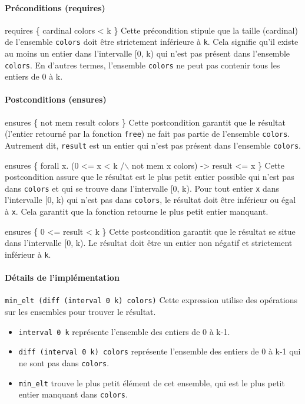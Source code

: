 \documentclass[11pt]{article}
\begin{document}
\paragraph{Préconditions (requires)}
\label{sec:org3ab6fb4}

requires \{ cardinal colors < k \}
  Cette précondition stipule que la taille (cardinal) 
de l'ensemble \texttt{colors} doit être strictement inférieure à \texttt{k}.
 Cela signifie qu'il existe au moins un entier dans l'intervalle [0, k) qui n'est pas présent dans l'ensemble \texttt{colors}. 
En d'autres termes, l'ensemble \texttt{colors} ne peut pas contenir tous les entiers de 0 à k.

\paragraph{Postconditions (ensures)}
\label{sec:orgfbcf911}

ensures \{ not mem result colors \}
  Cette postcondition garantit que le résultat (l'entier retourné par la fonction \texttt{free}) ne fait pas partie de l'ensemble \texttt{colors}. 
Autrement dit, \texttt{result} est un entier qui n'est pas présent dans l'ensemble \texttt{colors}.

ensures \{ forall x. (0 <= x < k /$\backslash$ not mem x colors) -> result <= x \}
  Cette postcondition assure que le résultat est le plus petit entier possible qui n'est pas dans \texttt{colors} et qui se trouve dans l'intervalle [0, k). 
Pour tout entier \texttt{x} dans l'intervalle [0, k) qui n'est pas dans \texttt{colors}, le résultat doit être inférieur ou égal à \texttt{x}. 
Cela garantit que la fonction retourne le plus petit entier manquant.

ensures \{ 0 <= result < k \}
  Cette postcondition garantit que le résultat se situe dans l'intervalle [0, k). 
Le résultat doit être un entier non négatif et strictement inférieur à \texttt{k}.

\paragraph{Détails de l'implémentation}
\label{sec:org974b123}

\texttt{min\_elt (diff (interval 0 k) colors)}
  Cette expression utilise des opérations sur les ensembles pour trouver le résultat.
\begin{itemize}
\item \texttt{interval 0 k} représente l'ensemble des entiers de 0 à k-1.
\item \texttt{diff (interval 0 k) colors} représente l'ensemble des entiers de 0 à k-1 qui ne sont pas dans \texttt{colors}.
\item \texttt{min\_elt} trouve le plus petit élément de cet ensemble, qui est le plus petit entier manquant dans \texttt{colors}.
\end{itemize}
\end{document}
